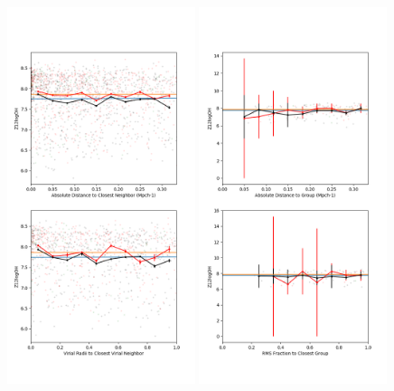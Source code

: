 \begin{figure}
    \includegraphics[width=0.49\textwidth]{Images/smallScaleEnvironment/dwarf_OH_300}
    \includegraphics[width=0.49\textwidth]{Images/smallScaleEnvironment/dwarf_OH_300_group}

\end{figure}
